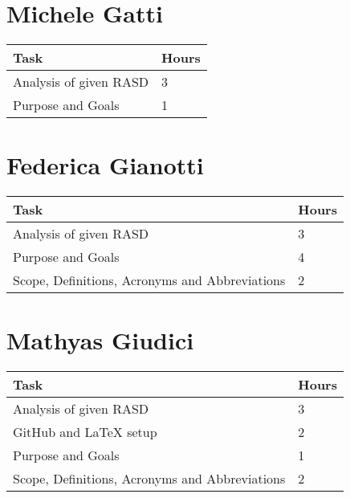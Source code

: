 \section{Michele Gatti}

\:
\begin{center}
\begin{tabular}{ | p{9 cm} | p{3 cm}  |  }
  \hline
    \textbf{Task} & \textbf{Hours }\\ \hline
    Analysis of given RASD & 3 \\ \hline
    Purpose and Goals & 1 \\ \hline
\end{tabular}
\end{center}
\:


\section{Federica Gianotti}

\:
\begin{center}
\begin{tabular}{ | p{9 cm} | p{3 cm}  |  }
  \hline
    \textbf{Task} & \textbf{Hours }\\ \hline
    Analysis of given RASD & 3 \\ \hline
    Purpose and Goals & 4 \\ \hline
    Scope, Definitions, Acronyms and Abbreviations & 2 \\ \hline
\end{tabular}
\end{center}
\:

\section{Mathyas Giudici}

\:
\begin{center}
\begin{tabular}{ | p{9 cm} | p{3 cm}  |  }
  \hline
    \textbf{Task} & \textbf{Hours }\\ \hline
    Analysis of given RASD & 3 \\ \hline
    GitHub and LaTeX setup & 2 \\ \hline
    Purpose and Goals & 1 \\ \hline
    Scope, Definitions, Acronyms and Abbreviations & 2 \\ \hline
\end{tabular}
\end{center}

\clearpage
